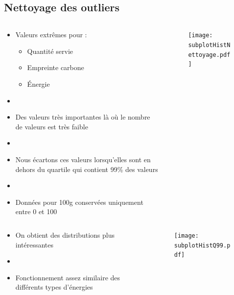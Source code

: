 \subsection{Nettoyage des outliers}
\begin{frame}{\insertsubsection}
  \begin{columns}
    \begin{column}{.3\textwidth}
      \begin{itemize}
        \item Valeurs extrêmes pour :
              \begin{itemize}
                \item Quantité servie
                \item Empreinte carbone
                \item Énergie
              \end{itemize}
        \item[]
        \item Des valeurs très importantes là où le nombre de valeurs est très faible
        \item[]
        \item Nous écartons ces valeurs lorsqu'elles sont en dehors du quartile qui contient 99\% des valeurs
        \item[] 
        \item Données pour 100g conservées uniquement entre 0 et 100
      \end{itemize}
    \end{column}
    \begin{column}{.7\textwidth}
      \begin{figure}
        \texttt{[image: subplotHistNettoyage.pdf]}
      \end{figure}
    \end{column}
  \end{columns}
\end{frame}

\begin{frame}{\insertsubsection}
  \begin{columns}
    \begin{column}{.3\textwidth}
      \begin{itemize}
        \item On obtient des distributions plus intéressantes
        \item[]
        \item Fonctionnement assez similaire des différents types d'énergies
      \end{itemize}
    \end{column}
    \begin{column}{.7\textwidth}
      \begin{figure}
        \texttt{[image: subplotHistQ99.pdf]}
      \end{figure}
    \end{column}
  \end{columns}
\end{frame}

